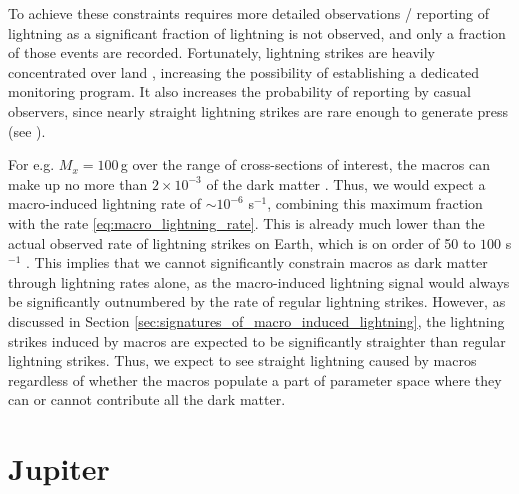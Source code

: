 \documentclass[%
 reprint,
 amsmath,amssymb,
 aps,
]{revtex4-2}
\newcommand{\vtwo}[1]{{\color{black} #1}}
\begin{document}
        To achieve these constraints requires more detailed observations / reporting of lightning as a significant fraction of lightning is not observed, and only a fraction of those events are recorded. Fortunately, lightning strikes are heavily concentrated over land \vtwo{\citep{Christian2003}}, increasing the possibility of establishing a dedicated monitoring program. It also increases the probability of reporting by casual observers, since nearly straight lightning strikes are rare enough to generate press (see \vtwo{\citet{Zimbabwe}}).

        For e.g. $M_x = 100\,$g over the range of cross-sections of interest, the macros can make up no more than $2\times 10^{-3}$ of the dark matter \vtwo{\citep{Sidhu2019death}}. Thus, we would expect a macro-induced lightning rate of $\sim 10^{-6}$ s$^{-1}$, combining this maximum fraction with the rate \eqref{eq:macro_lightning_rate}. This is already much lower than the actual observed rate of lightning strikes on Earth, which is on order of 50 to $100$ s$^{-1}$ \vtwo{\citep{Mackerras1998}}. This implies that we cannot significantly constrain macros as dark matter through lightning rates alone, as the macro-induced lightning signal would always be significantly outnumbered by the rate of regular lightning strikes. However, as discussed in Section \ref{sec:signatures_of_macro_induced_lightning}, the lightning strikes induced by macros are expected to be significantly straighter than regular lightning strikes. Thus, we expect to see straight lightning caused by macros regardless of whether the macros populate a part of parameter space where they can or cannot contribute all the dark matter.

    


\section{Jupiter} %
\label{sec:jovian_bolides}
\end{document}
